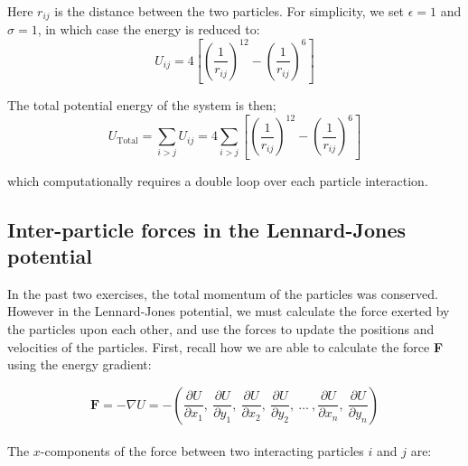 \documentclass{article}
\begin{document}
Here $r_{ij}$ is the distance between the two particles.
For simplicity, we set $\epsilon = 1$ and $\sigma = 1$, in which case the energy is reduced to:
\begin{equation}
    U_{ij} = 4 \left[ \left(\frac{1}{r_{ij}} \right)^{12} - \left(\frac{1}{r_{ij}} \right)^6 \right]
\end{equation}

The total potential energy of the system is then;
\begin{equation}
    U_{\mathrm{Total}}
    = \sum_{i>j} U_{ij}
    = 4 \sum_{i>j} \left[ \left(\frac{1}{r_{ij}} \right)^{12} - \left(\frac{1}{r_{ij}} \right)^6 \right] \label{eq:total_energy}
\end{equation}

which computationally requires a double loop over each particle interaction.


% 

\subsection{Inter-particle forces in the Lennard-Jones potential}

In the past two exercises, the total momentum of the particles was conserved.
However in the Lennard-Jones potential, we must calculate the force exerted by the particles upon each other, and use the forces to update the positions and velocities of the particles.
First, recall how we are able to calculate the force \textbf{F} using the energy gradient:

\begin{equation}
    \mathbf{F} = -\nabla U = -\left( \frac{\partial U}{\partial x_1},\ \frac{\partial U}{\partial y_1},\  \frac{\partial U}{\partial x_2},\ \frac{\partial U}{\partial y_2},\ \ldots\ ,\frac{\partial U}{\partial x_n},\ \frac{\partial U}{\partial y_n}\right)
    \label{eq:force}
\end{equation}\\

The $x$-components of the force between two interacting particles $i$ and $j$ are:
\end{document}
